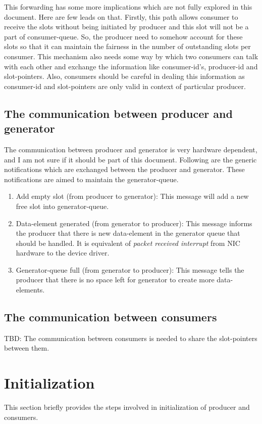 \documentclass[a4paper,twoside]{report} %
\begin{document}
\begin{enumerate}
  This forwarding has some more implications which are not fully
  explored in this document.  Here are few leads on that.  Firstly,
  this path allows consumer to receive the slots without being
  initiated by producer and this slot will not be a part of
  consumer-queue.  So, the producer need to somehow account for these
  slots so that it can maintain the fairness in the number of
  outstanding slots per consumer.  This mechanism also needs some way
  by which two consumers can talk with each other and exchange the 
  information like consumer-id's, producer-id and slot-pointers.
  Also, consumers should be careful in dealing this information as
  consumer-id and slot-pointers are only valid in context of particular
  producer.
\end{enumerate} 


\subsection{The communication between producer and generator}
The communication between producer and generator is very
hardware dependent, and I am not sure if it should be part of this
document.  Following are the generic notifications which are exchanged
between the producer and generator.  These notifications are aimed to
maintain the generator-queue.

\begin{enumerate} 
  \item Add empty slot (from producer to generator): This message will
  add a new free slot into generator-queue.
  \item Data-element generated (from generator to producer): This
  message informs the producer that there is new data-element in the
  generator queue that should be handled.  It is equivalent of
  \textit{packet received interrupt} from NIC hardware to the device
  driver.
  \item Generator-queue full (from generator to producer): This
  message tells the producer that there is no space left for generator
  to create more data-elements.
\end{enumerate} 

\subsection{The communication between consumers}
TBD:  The communication between consumers is needed to share the
slot-pointers between them.

\section{Initialization}
\label{sec:initialization}
This section briefly provides the steps involved in initialization of
producer and consumers.
\end{document}
